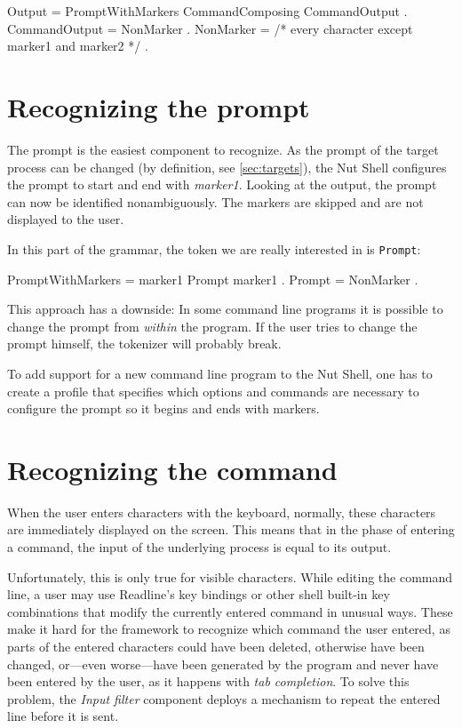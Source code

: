 \documentclass[paper=a4,twoside,abstract=on,cleardoublepage=empty,numbers=noenddot,toc=bib,12pt,appendixprefix=true]{scrreprt}
\begin{document}
\begin{ebnf}
Output = { PromptWithMarkers CommandComposing CommandOutput } .
CommandOutput = { NonMarker } .
NonMarker = /* every character except marker1 and marker2 */ .
\end{ebnf}

\section{Recognizing the prompt}

The prompt is the easiest component to recognize. As the prompt of the target process can be changed (by definition, see \cref{sec:targets}), the Nut Shell configures the prompt to start and end with \emph{marker1}. Looking at the output, the prompt can now be identified nonambiguously. The markers are skipped and are not displayed to the user.

In this part of the grammar, the token we are really interested in is \texttt{Prompt}:

\begin{ebnf}
PromptWithMarkers = marker1 Prompt marker1 .
Prompt = { NonMarker } .
\end{ebnf}
%
This approach has a downside: In some command line programs it is possible to change the prompt from \emph{within} the program. If the user tries to change the prompt himself, the tokenizer will probably break.

To add support for a new command line program to the Nut Shell, one has to create a profile that specifies which options and commands are necessary to configure the prompt so it begins and ends with markers.

\section{Recognizing the command}
\label{sec:reccmd}

When the user enters characters with the keyboard, normally, these characters are immediately displayed on the screen. This means that in the phase of entering a command, the input of the underlying process is equal to its output.

Unfortunately, this is only true for visible characters. While editing the command line, a user may use Readline's key bindings or other shell built-in key combinations that modify the currently entered command in unusual ways. These make it hard for the framework to recognize which command the user entered, as parts of the entered characters could have been deleted, otherwise have been changed, or---even worse---have been generated by the program and never have been entered by the user, as it happens with \emph{tab completion}. To solve this problem, the \emph{Input filter} component deploys a mechanism to repeat the entered line before it is sent.
\end{document}
